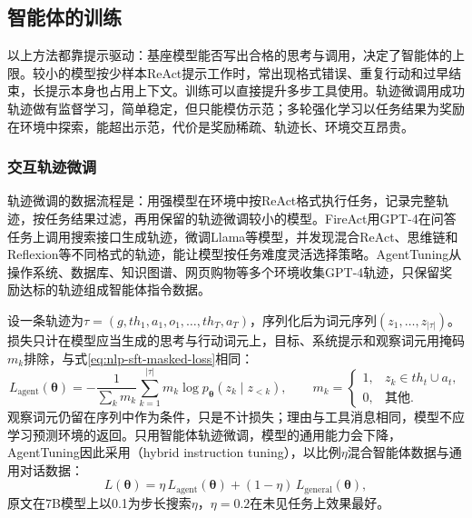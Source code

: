 \subsection{智能体的训练}
\label{sec:nlp-execution-agent-training}

以上方法都靠提示驱动：基座模型能否写出合格的思考与调用，决定了智能体的上限。较小的模型按少样本ReAct提示工作时，常出现格式错误、重复行动和过早结束，长提示本身也占用上下文。训练可以直接提升多步工具使用。轨迹微调用成功轨迹做有监督学习，简单稳定，但只能模仿示范；多轮强化学习以任务结果为奖励在环境中探索，能超出示范，代价是奖励稀疏、轨迹长、环境交互昂贵。

\subsubsection{交互轨迹微调}
\label{sec:nlp-execution-trajectory-sft}

轨迹微调的数据流程是：用强模型在环境中按ReAct格式执行任务，记录完整轨迹，按任务结果过滤，再用保留的轨迹微调较小的模型。FireAct用GPT-4在问答任务上调用搜索接口生成轨迹，微调Llama等模型，并发现混合ReAct、思维链和Reflexion等不同格式的轨迹，能让模型按任务难度灵活选择策略。AgentTuning从操作系统、数据库、知识图谱、网页购物等多个环境收集GPT-4轨迹，只保留奖励达标的轨迹组成智能体指令数据。

设一条轨迹为$\tau=(g,\mathit{th}_1,a_1,o_1,\ldots,\mathit{th}_T,a_T)$，序列化后为词元序列$(z_1,\ldots,z_{|\tau|})$。损失只计在模型应当生成的思考与行动词元上，目标、系统提示和观察词元用掩码$m_k$排除，与式\eqref{eq:nlp-sft-masked-loss}相同：
\begin{equation}
 L_{\mathrm{agent}}(\bm{\theta})=-\frac{1}{\sum_k m_k}\sum_{k=1}^{|\tau|}m_k\log p_{\bm{\theta}}(z_k\mid z_{<k}),\qquad
 m_k=\begin{cases}1,& z_k\in\mathit{th}_t\cup a_t,\\0,&\text{其他}.\end{cases}
 \label{eq:nlp-execution-trajectory-sft}
\end{equation}
观察词元仍留在序列中作为条件，只是不计损失；理由与工具消息相同，模型不应学习预测环境的返回。只用智能体轨迹微调，模型的通用能力会下降，AgentTuning因此采用（hybrid instruction tuning），以比例$\eta$混合智能体数据与通用对话数据：
\begin{equation}
 L(\bm{\theta})=\eta\,L_{\mathrm{agent}}(\bm{\theta})+(1-\eta)\,L_{\mathrm{general}}(\bm{\theta}),
 \label{eq:nlp-execution-hybrid-tuning}
\end{equation}
原文在7B模型上以0.1为步长搜索$\eta$，$\eta=0.2$在未见任务上效果最好。

